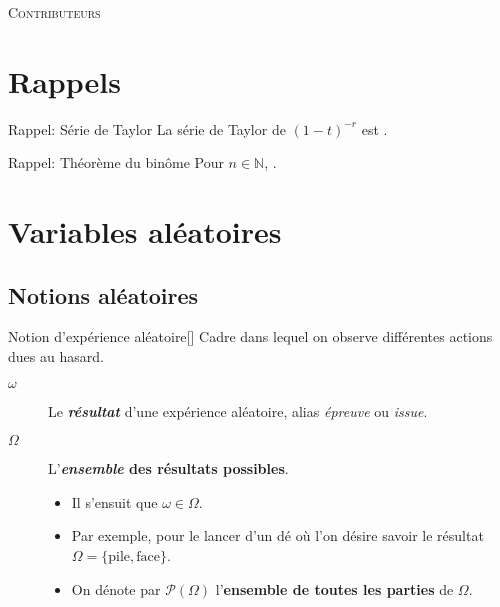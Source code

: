 \documentclass[10pt, french]{report}
\begin{document}
\begin{center}
	\textsc{\Large Contributeurs}\\[0.5cm] 
\end{center}
%

\newpage
\raggedcolumns
\begin{multicols*}{2}
\chapter*{Rappels}
\begin{rappel}{Rappel: Série de Taylor}
La série de Taylor de $(1 - t)^{-r}$ est .
\end{rappel}

\begin{rappel}{Rappel: Théorème du binôme}
Pour $n \in \mathbb{N}$, .
\end{rappel}



\newpage
\chapter{Variables aléatoires}
\section{Notions aléatoires}
\begin{definitionGENERAL}{Notion d'expérience aléatoire}[]
Cadre dans lequel on observe différentes actions dues au hasard.

\begin{distributions}[Notation]
\begin{description}
	\item[$\omega$]	Le \textbf{\textit{résultat}} d'une expérience aléatoire, alias \textit{épreuve} ou \textit{issue}.
	\item[$\Omega$]	L'\textbf{\textit{ensemble} des résultats possibles}.
		\begin{itemize}
		\item	Il s'ensuit que $\omega \in \Omega$.
		\item	Par exemple, pour le lancer d'un dé où l'on désire savoir le résultat $\Omega = \{\text{pile}, \text{face}\}$.
		\item	On dénote par $\mathcal{P}(\Omega)$ l'\textbf{ensemble de toutes les parties} de $\Omega$.
		\end{itemize}
\end{description}
\end{distributions}
\end{definitionGENERAL}


\end{multicols*}
\end{document}
